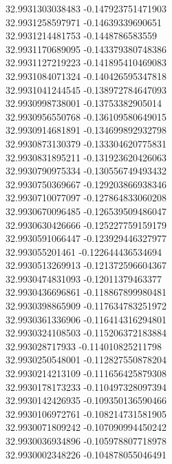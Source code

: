 {32.9931303038483	-0.147923751471903\\
32.9931258597971	-0.14639339690651\\
32.9931214481753	-0.1448786583559\\
32.9931170689095	-0.143379380748386\\
32.9931127219223	-0.141895410469083\\
32.9931084071324	-0.140426595347818\\
32.9931041244545	-0.138972784647093\\
32.9930998738001	-0.13753382905014\\
32.9930956550768	-0.136109580649015\\
32.9930914681891	-0.134699892932798\\
32.9930873130379	-0.133304620775831\\
32.9930831895211	-0.131923620426063\\
32.9930790975334	-0.130556749493432\\
32.9930750369667	-0.129203866938346\\
32.9930710077097	-0.127864833060208\\
32.9930670096485	-0.126539509486047\\
32.9930630426666	-0.125227759159179\\
32.9930591066447	-0.123929446327977\\
32.993055201461	-0.122644436534694\\
32.9930513269913	-0.121372596604367\\
32.9930474831093	-0.12011379463377\\
32.9930436696861	-0.118867899980481\\
32.9930398865909	-0.117634783251972\\
32.9930361336906	-0.116414316294801\\
32.9930324108503	-0.115206372183884\\
32.993028717933	-0.114010825211798\\
32.9930250548001	-0.112827550878204\\
32.9930214213109	-0.111656425879308\\
32.9930178173233	-0.110497328097394\\
32.9930142426935	-0.109350136590466\\
32.9930106972761	-0.108214731581905\\
32.9930071809242	-0.107090994450242\\
32.9930036934896	-0.105978807718978\\
32.9930002348226	-0.104878055046491\\
}
